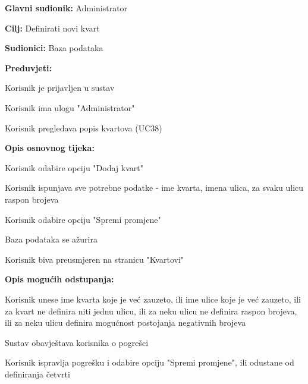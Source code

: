 					\noindent {}
					\begin{packed_item}
	
						\item \textbf{Glavni sudionik: }Administrator
						\item  \textbf{Cilj:} Definirati novi kvart
						\item  \textbf{Sudionici:} Baza podataka
						\item  \textbf{Preduvjeti:}
						\item[] \begin{packed_enum}
							\item Korisnik je prijavljen u sustav
							\item Korisnik ima ulogu "Administrator"
							\item Korisnik pregledava popis kvartova (UC38)
						\end{packed_enum}
						\item  \textbf{Opis osnovnog tijeka:}
						
						\item[] \begin{packed_enum}
	
							\item Korisnik odabire opciju "Dodaj kvart"
							\item Korisnik ispunjava sve potrebne podatke - ime kvarta, imena ulica, za svaku ulicu raspon brojeva
							\item Korisnik odabire opciju "Spremi promjene"
							\item Baza podataka se ažurira
							\item Korisnik biva preusmjeren na stranicu "Kvartovi"
						\end{packed_enum}
						
						\item  \textbf{Opis mogućih odstupanja:}
						
						\item[] \begin{packed_item}
	
							\item[3.a] Korisnik unese ime kvarta koje je već zauzeto, ili ime ulice koje je već zauzeto, ili za kvart ne definira niti jednu ulicu, ili za neku ulicu ne definira raspon brojeva, ili za neku ulicu definira mogućnost postojanja negativnih brojeva
							\item[] \begin{packed_enum}
								
								\item Sustav obavještava korisnika o pogrešci
								\item Korisnik ispravlja pogrešku i odabire opciju "Spremi promjene", ili odustane od definiranja četvrti
								
							\end{packed_enum}
							
						\end{packed_item}
					\end{packed_item}
					
